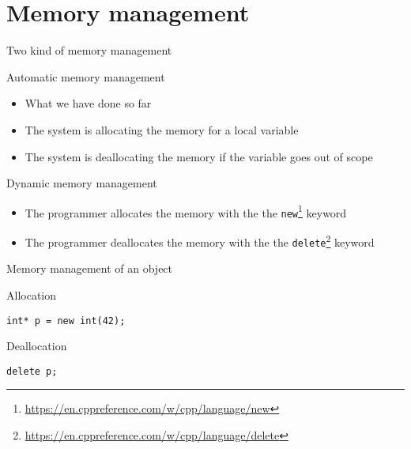 \documentclass[\classoption]{beamer}
\begin{document}
\section{Memory management}


\begin{frame}{Two kind of memory management}

\begin{block}{Automatic memory management}
\begin{itemize}
\item What we have done so far
\item The system is allocating the memory for a local variable
\item The system is deallocating the memory if the variable goes out of scope
\end{itemize}
\end{block}

\begin{block}{Dynamic memory management}
\begin{itemize}
\item The programmer allocates the memory with the the \lstinline|new|\footnote{\tiny\url{https://en.cppreference.com/w/cpp/language/new}} keyword
\item The programmer deallocates the memory with the the \lstinline|delete|\footnote{\tiny\url{https://en.cppreference.com/w/cpp/language/delete}} keyword
\end{itemize}
\end{block}

\end{frame}

\begin{frame}[fragile]{Memory management of an object}

\begin{block}{Allocation}
\begin{lstlisting}
int* p = new int(42);
\end{lstlisting}
\end{block}

\begin{block}{Deallocation}
\begin{lstlisting}
delete p;
\end{lstlisting}
\end{block}


\end{frame}
\end{document}
